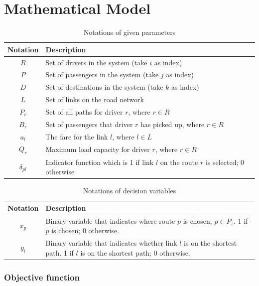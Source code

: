 \section{Mathematical Model}

\renewcommand\arraystretch{1.5}
\par
\begin{table}[ht]
  \centering
  \caption{Notations of given parameters}
  \begin{tabularx}{\textwidth}{cX}
  \toprule
  Notation & Description \\
  \midrule
    $R$ & Set of drivers in the system (take $i$ as index) \\
    $P$ & Set of passengers in the system (take $j$ as index) \\
    $D$ & Set of destinations in the system (take $k$ as index) \\
    $L$ & Set of links on the road network \\
    $P_r$ & Set of all paths for driver $r$, where $r \in R$ \\
    $B_r$ & Set of passengers that driver $r$ has picked up, where $r \in R$ \\
    $a_l$ & The fare for the link $l$, where $l \in L$ \\
    $Q_r$ & Maximum load capacity for driver $r$, where $r \in R$ \\
    $\delta_{pl}$ & Indicator function which is 1 if link $l$ on the route $r$ is selected; 0 otherwise \\
  \bottomrule
  \end{tabularx}
\end{table}  
\par

\begin{table}[ht]
  \centering
  \caption{Notations of decision variables}
  \begin{tabularx}{\textwidth}{cX}
  \toprule
  Notation & Description \\
  \midrule
  $x_p$ & Binary variable that indicates where route $p$ is chosen, $p \in P_z$. 1 if $p$ is chosen; 0 otherwise. \\
  $y_l$ & Binary variable that indicates whether link $l$ is on the shortest path. 1 if $l$ is on the shortest path; 0 otherwise. \\
  \bottomrule
  \end{tabularx}
\end{table}  
\newpage

\subsubsection*{Objective function}

